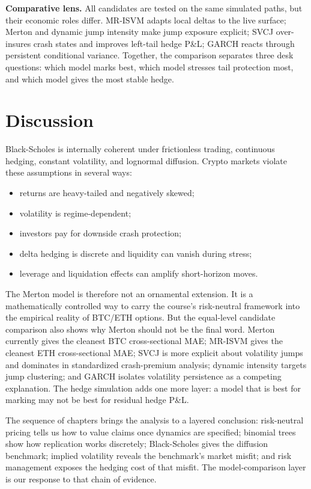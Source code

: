 \documentclass[11pt]{article}
\begin{document}
\textbf{Comparative lens.} All candidates are tested on the same simulated paths, but their economic roles differ. MR-ISVM adapts local deltas to the live surface; Merton and dynamic jump intensity make jump exposure explicit; SVCJ over-insures crash states and improves left-tail hedge P\&L; GARCH reacts through persistent conditional variance. Together, the comparison separates three desk questions: which model marks best, which model stresses tail protection most, and which model gives the most stable hedge.

\section{Discussion}

Black-Scholes is internally coherent under frictionless trading, continuous hedging, constant volatility, and lognormal diffusion. Crypto markets violate these assumptions in several ways:
\begin{itemize}
\item returns are heavy-tailed and negatively skewed;
\item volatility is regime-dependent;
\item investors pay for downside crash protection;
\item delta hedging is discrete and liquidity can vanish during stress;
\item leverage and liquidation effects can amplify short-horizon moves.
\end{itemize}

The Merton model is therefore not an ornamental extension. It is a mathematically controlled way to carry the course's risk-neutral framework into the empirical reality of BTC/ETH options. But the equal-level candidate comparison also shows why Merton should not be the final word. Merton currently gives the cleanest BTC cross-sectional MAE; MR-ISVM gives the cleanest ETH cross-sectional MAE; SVCJ is more explicit about volatility jumps and dominates in standardized crash-premium analysis; dynamic intensity targets jump clustering; and GARCH isolates volatility persistence as a competing explanation. The hedge simulation adds one more layer: a model that is best for marking may not be best for residual hedge P\&L.

The sequence of chapters brings the analysis to a layered conclusion: risk-neutral pricing tells us how to value claims once dynamics are specified; binomial trees show how replication works discretely; Black-Scholes gives the diffusion benchmark; implied volatility reveals the benchmark's market misfit; and risk management exposes the hedging cost of that misfit. The model-comparison layer is our response to that chain of evidence.
\end{document}
